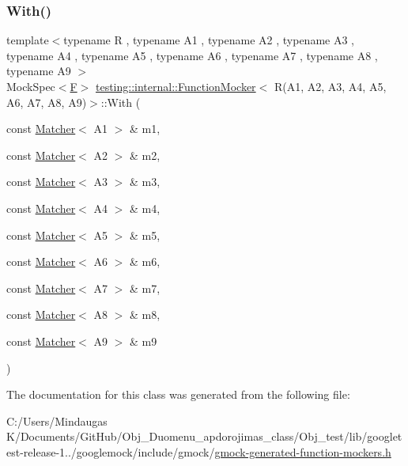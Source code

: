 \subsubsection{\texorpdfstring{With()}{With()}}
{\footnotesize\ttfamily template$<$typename R , typename A1 , typename A2 , typename A3 , typename A4 , typename A5 , typename A6 , typename A7 , typename A8 , typename A9 $>$ \\
Mock\+Spec$<$\mbox{\hyperlink{classtesting_1_1internal_1_1_function_mocker_3_01_r_07_a1_00_01_a2_00_01_a3_00_01_a4_00_01_a5_00d00d8722bf1ad86ca8049508f133d393_a8de64ec5559bd4e4410a4374e9c93e4e}{F}}$>$ \mbox{\hyperlink{classtesting_1_1internal_1_1_function_mocker}{testing\+::internal\+::\+Function\+Mocker}}$<$ R(A1, A2, A3, A4, A5, A6, A7, A8, A9)$>$\+::With (\begin{DoxyParamCaption}\item[{const \mbox{\hyperlink{classtesting_1_1_matcher}{Matcher}}$<$ A1 $>$ \&}]{m1,  }\item[{const \mbox{\hyperlink{classtesting_1_1_matcher}{Matcher}}$<$ A2 $>$ \&}]{m2,  }\item[{const \mbox{\hyperlink{classtesting_1_1_matcher}{Matcher}}$<$ A3 $>$ \&}]{m3,  }\item[{const \mbox{\hyperlink{classtesting_1_1_matcher}{Matcher}}$<$ A4 $>$ \&}]{m4,  }\item[{const \mbox{\hyperlink{classtesting_1_1_matcher}{Matcher}}$<$ A5 $>$ \&}]{m5,  }\item[{const \mbox{\hyperlink{classtesting_1_1_matcher}{Matcher}}$<$ A6 $>$ \&}]{m6,  }\item[{const \mbox{\hyperlink{classtesting_1_1_matcher}{Matcher}}$<$ A7 $>$ \&}]{m7,  }\item[{const \mbox{\hyperlink{classtesting_1_1_matcher}{Matcher}}$<$ A8 $>$ \&}]{m8,  }\item[{const \mbox{\hyperlink{classtesting_1_1_matcher}{Matcher}}$<$ A9 $>$ \&}]{m9 }\end{DoxyParamCaption})\hspace{0.3cm}{\ttfamily [inline]}}



The documentation for this class was generated from the following file\+:\begin{DoxyCompactItemize}
\item 
C\+:/\+Users/\+Mindaugas K/\+Documents/\+Git\+Hub/\+Obj\+\_\+\+Duomenu\+\_\+apdorojimas\+\_\+class/\+Obj\+\_\+test/lib/googletest-\/release-\/1../googlemock/include/gmock/\mbox{\hyperlink{_obj__test_2lib_2googletest-release-1_88_81_2googlemock_2include_2gmock_2gmock-generated-function-mockers_8h}{gmock-\/generated-\/function-\/mockers.\+h}}\end{DoxyCompactItemize}
